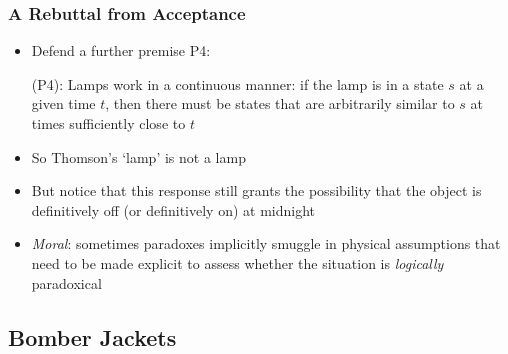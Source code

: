 \begin{frame}
\frametitle{A Rebuttal from Acceptance}

\begin{itemize}[<+->]

\item Defend a further premise P4:

\item[(P4):] Lamps work in a continuous manner: if the lamp is in a state $s$ at a given time $t$, then there must be states that are arbitrarily similar to $s$ at times sufficiently close to $t$

\item So Thomson's `lamp' is not a lamp

\item But notice that this response still grants the possibility that the object is definitively off (or definitively on) at midnight

\item \emph{Moral}: sometimes paradoxes implicitly smuggle in physical assumptions that need to be made explicit to assess whether the situation is \textit{logically} paradoxical

\end{itemize}
\end{frame}




\subsection{Bomber Jackets}


